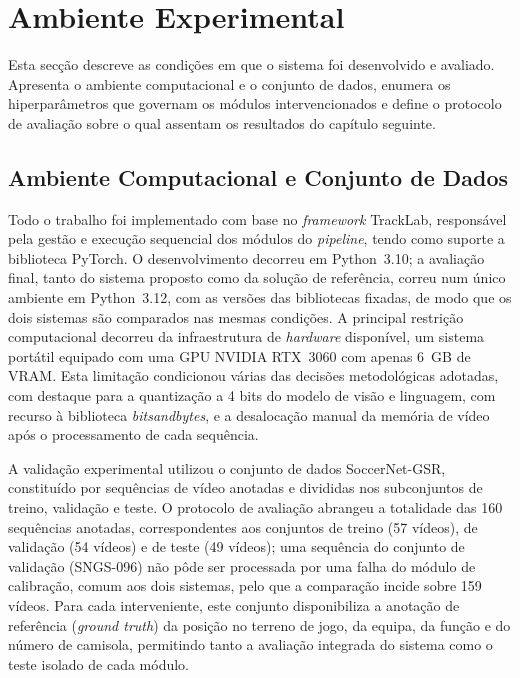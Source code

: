 \FloatBarrier

\section{Ambiente Experimental}

Esta secção descreve as condições em que o sistema foi desenvolvido e avaliado. Apresenta o ambiente
computacional e o conjunto de dados, enumera os hiperparâmetros que governam os módulos
intervencionados e define o protocolo de avaliação sobre o qual assentam os resultados do capítulo
seguinte.

\subsection{Ambiente Computacional e Conjunto de Dados}

Todo o trabalho foi implementado com base no \emph{framework} TrackLab, responsável pela gestão e
execução sequencial dos módulos do \emph{pipeline}, tendo como suporte a biblioteca PyTorch. O
desenvolvimento decorreu em Python~3.10; a avaliação final, tanto do sistema proposto como da
solução de referência, correu num único ambiente em Python~3.12, com as versões das bibliotecas
fixadas, de modo que os dois sistemas são comparados nas mesmas condições.
A principal restrição computacional decorreu da infraestrutura de \emph{hardware}
disponível, um sistema portátil equipado com uma GPU NVIDIA RTX~3060 com apenas 6~GB de VRAM. Esta
limitação condicionou várias das decisões metodológicas adotadas, com destaque para a quantização a
4 bits do modelo de visão e linguagem, com recurso à biblioteca \emph{bitsandbytes}, e a desalocação
manual da memória de vídeo após o processamento de cada sequência.

A validação experimental utilizou o conjunto de dados SoccerNet-GSR, constituído por
sequências de vídeo anotadas e divididas nos subconjuntos de treino, validação e teste.
O protocolo de avaliação abrangeu a totalidade das 160 sequências anotadas,
correspondentes aos conjuntos de treino (57 vídeos), de validação (54 vídeos) e de teste
(49 vídeos); uma sequência do conjunto de validação (SNGS-096) não pôde ser processada por
uma falha do módulo de calibração, comum aos dois sistemas, pelo que a comparação incide
sobre 159 vídeos. Para cada interveniente, este conjunto disponibiliza a anotação de
referência (\emph{ground truth}) da posição no terreno de jogo, da equipa, da função e do
número de camisola, permitindo tanto a avaliação integrada do sistema como o teste
isolado de cada módulo.

